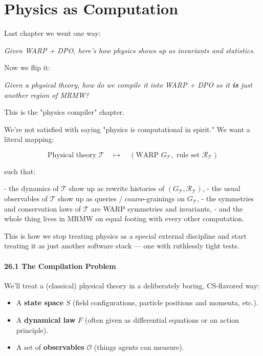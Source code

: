 \chapter{Physics as Computation}
\label{sec:physics-as-computation}

Last chapter we went one way:

\begin{center}
\emph{Given WARP + DPO, here’s how physics shows up as invariants and statistics.}
\end{center}

Now we flip it:

\begin{center}
\emph{Given a physical theory, how do we compile it into WARP + DPO so it
\textbf{is} just another region of MRMW?}
\end{center}

This is the "physics compiler" chapter.

We’re not satisfied with saying "physics is computational in spirit."  
We want a literal mapping:

\[
  \text{Physical theory } \mathcal{T}
  \quad\longmapsto\quad
  (\text{WARP } G_\mathcal{T}, \text{ rule set } \mathcal{R}_\mathcal{T})
\]

such that:

- the dynamics of $\mathcal{T}$ show up as rewrite histories of $(G_\mathcal{T},\mathcal{R}_\mathcal{T})$,
- the usual observables of $\mathcal{T}$ show up as queries / coarse-grainings on $G_\mathcal{T}$,
- the symmetries and conservation laws of $\mathcal{T}$ are WARP symmetries and invariants,
- and the whole thing lives in MRMW on equal footing with every other computation.

This is how we stop treating physics as a special external discipline and start
treating it as just another software stack — one with ruthlessly tight tests.

\subsubsection*{26.1  The Compilation Problem}

We’ll treat a (classical) physical theory in a deliberately boring, CS-flavored way:

\begin{itemize}
  \item A \textbf{state space} $S$ (field configurations, particle positions and momenta, etc.).
  \item A \textbf{dynamical law} $F$ (often given as differential equations or an action principle).
  \item A set of \textbf{observables} $\mathcal{O}$ (things agents can measure).
\end{itemize}

